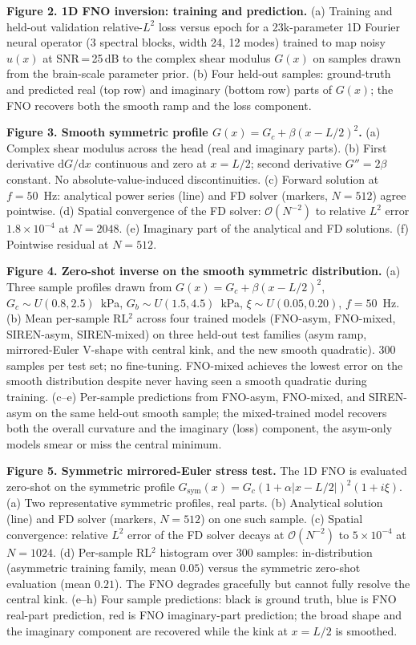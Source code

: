 \documentclass[11pt,letterpaper]{article}
\begin{document}
\textbf{Figure 2. 1D FNO inversion: training and prediction.}
(a) Training and held-out validation relative-$L^{2}$ loss versus epoch
for a 23k-parameter 1D Fourier neural operator (3 spectral blocks,
width 24, 12 modes) trained to map noisy $\hat u(x)$ at SNR\,=\,25\,dB
to the complex shear modulus $G(x)$ on samples drawn from the
brain-scale parameter prior. (b) Four held-out samples: ground-truth
and predicted real (top row) and imaginary (bottom row) parts of
$G(x)$; the FNO recovers both the smooth ramp and the loss component.

\textbf{Figure 3. Smooth symmetric profile
$G(x)=G_c+\beta(x-L/2)^2$.}
(a) Complex shear modulus across the head (real and imaginary parts).
(b) First derivative $\mathrm{d}G/\mathrm{d}x$ continuous and zero at
$x=L/2$; second derivative $G''=2\beta$ constant. No
absolute-value-induced discontinuities. (c) Forward solution at
$f=50$~Hz: analytical power series (line) and FD solver (markers,
$N=512$) agree pointwise. (d) Spatial convergence of the FD solver:
$\mathcal{O}(N^{-2})$ to relative $L^{2}$ error
$1.8\!\times\!10^{-4}$ at $N=2048$. (e) Imaginary part of the analytical
and FD solutions. (f) Pointwise residual at $N=512$.

\textbf{Figure 4. Zero-shot inverse on the smooth symmetric
distribution.}
(a) Three sample profiles drawn from
$G(x)=G_c+\beta(x-L/2)^2$, $G_c\!\sim\!U(0.8,2.5)$~kPa,
$G_b\!\sim\!U(1.5,4.5)$~kPa, $\xi\!\sim\!U(0.05,0.20)$, $f=50$~Hz.
(b) Mean per-sample RL$^{2}$ across four trained models (FNO-asym,
FNO-mixed, SIREN-asym, SIREN-mixed) on three held-out test families
(asym ramp, mirrored-Euler V-shape with central kink, and the new
smooth quadratic). 300 samples per test set; no fine-tuning. FNO-mixed
achieves the lowest error on the smooth distribution despite never
having seen a smooth quadratic during training. (c--e) Per-sample
predictions from FNO-asym, FNO-mixed, and SIREN-asym on the same
held-out smooth sample; the mixed-trained model recovers both the
overall curvature and the imaginary (loss) component, the asym-only
models smear or miss the central minimum.

\textbf{Figure 5. Symmetric mirrored-Euler stress test.}
The 1D FNO is evaluated zero-shot on the symmetric profile
$G_{\mathrm{sym}}(x)=G_{c}(1+\alpha|x-L/2|)^{2}(1+i\xi)$. (a) Two
representative symmetric profiles, real parts. (b) Analytical solution
(line) and FD solver (markers, $N=512$) on one such sample. (c) Spatial
convergence: relative $L^{2}$ error of the FD solver decays at
$\mathcal{O}(N^{-2})$ to $5\!\times\!10^{-4}$ at $N=1024$. (d) Per-sample
RL$^{2}$ histogram over 300 samples: in-distribution (asymmetric
training family, mean $0.05$) versus the symmetric zero-shot evaluation
(mean $0.21$). The FNO degrades gracefully but cannot fully resolve the
central kink. (e--h) Four sample predictions: black is ground truth, blue
is FNO real-part prediction, red is FNO imaginary-part prediction; the
broad shape and the imaginary component are recovered while the kink at
$x=L/2$ is smoothed.
\end{document}
